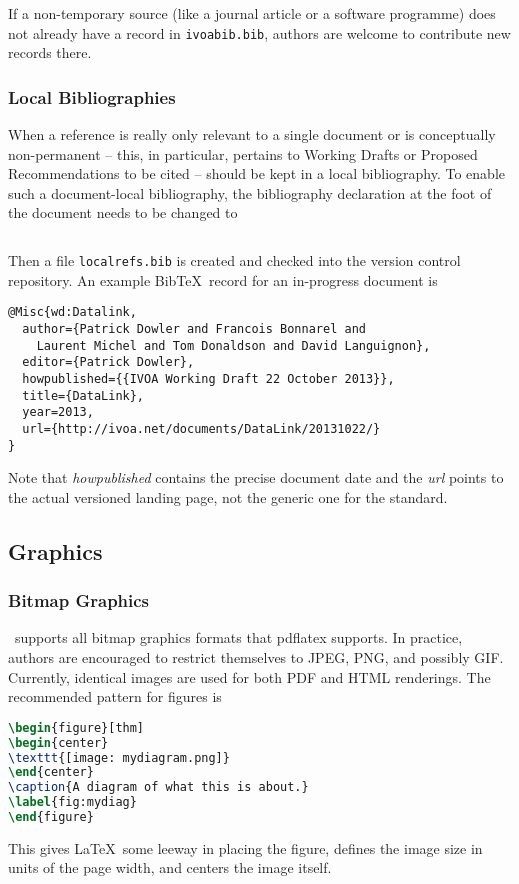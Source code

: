 \documentclass[11pt,a4paper]{ivoa}
\newcommand{\BibTeX}{BibTeX}
\begin{document}
If a non-temporary source (like a journal article or a software
programme) does not already have a record in \texttt{ivoabib.bib},
authors are welcome to contribute new records there.

\subsubsection{Local Bibliographies}

When a reference is really only relevant to a single document or is
conceptually non-permanent -- this, in particular, pertains to Working
Drafts or Proposed Recommendations to be cited -- should be kept in a
local bibliography.  To enable such a document-local bibliography,
the bibliography declaration at the foot of the document needs to be
changed to

\begin{lstlisting}[language=tex]

\end{lstlisting}

Then a file \texttt{localrefs.bib} is created and checked into the
version control repository.  An example \BibTeX\ record for an
in-progress document is

\begin{lstlisting}
@Misc{wd:Datalink,
  author={Patrick Dowler and Francois Bonnarel and 
    Laurent Michel and Tom Donaldson and David Languignon},
  editor={Patrick Dowler},
  howpublished={{IVOA Working Draft 22 October 2013}},
  title={DataLink},
  year=2013,
  url={http://ivoa.net/documents/DataLink/20131022/}
}
\end{lstlisting}

Note that \emph{howpublished} contains the precise document date and the
\emph{url} points to the actual versioned landing page, not the generic
one for the standard.

\subsection{Graphics}

\subsubsection{Bitmap Graphics}

\ivoatex\ supports all bitmap graphics formats that pdflatex supports.
In practice, authors are encouraged to restrict themselves to JPEG, PNG,
and possibly GIF.  Currently, identical images are used for both PDF and
HTML renderings.  The recommended pattern for figures is
\begin{lstlisting}[language=tex]
\begin{figure}[thm]
\begin{center}
\texttt{[image: mydiagram.png]}
\end{center}
\caption{A diagram of what this is about.}
\label{fig:mydiag}
\end{figure}
\end{lstlisting}
This gives \LaTeX\ some leeway in placing the figure, defines the image
size in units of the page width, and centers the image itself.
\end{document}

